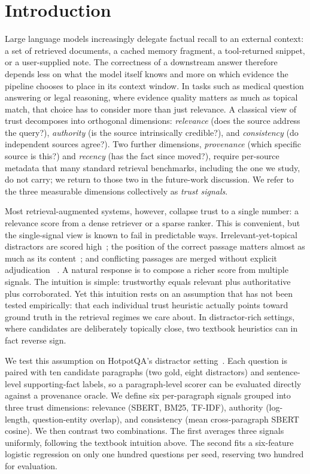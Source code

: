 \section{Introduction}
\label{sec:introduction}

Large language models increasingly delegate factual recall to an
external context: a set of retrieved documents, a cached memory
fragment, a tool-returned snippet, or a user-supplied note. The
correctness of a downstream answer therefore depends less on what the
model itself knows and more on which evidence the pipeline chooses to
place in its context window. In tasks such as medical question answering or legal reasoning, where
evidence quality matters as much as topical match, that choice has to
consider more than just relevance. A classical view of trust decomposes
into orthogonal dimensions: \emph{relevance} (does the source address
the query?), \emph{authority} (is the source intrinsically credible?),
and \emph{consistency} (do independent sources agree?). Two further
dimensions, \emph{provenance} (which specific source is this?) and
\emph{recency} (has the fact since moved?), require per-source metadata
that many standard retrieval benchmarks, including the one we study,
do not carry; we return to those two in the future-work discussion. We
refer to the three measurable dimensions collectively as \emph{trust
signals}.

Most retrieval-augmented systems, however, collapse trust to a single
number: a relevance score from a dense retriever or a sparse ranker.
This is convenient, but the single-signal view is known to fail in
predictable ways. Irrelevant-yet-topical distractors are scored
high~\cite{yoran2024makingrag}; the position of the correct passage
matters almost as much as its content~\cite{liu2024lostinthemiddle};
and conflicting passages are merged without explicit adjudication
~\cite{xie2024adaptive}. A natural response is to compose a richer
score from multiple signals. The intuition is simple: trustworthy
equals relevant plus authoritative plus corroborated. Yet this
intuition rests on an assumption that has not been tested empirically:
that each individual trust heuristic actually points toward ground
truth in the retrieval regimes we care about. In distractor-rich
settings, where candidates are deliberately topically close, two
textbook heuristics can in fact reverse sign.

We test this assumption on HotpotQA's distractor
setting~\cite{yang2018hotpotqa}. Each question is paired with ten
candidate paragraphs (two gold, eight distractors) and sentence-level
supporting-fact labels, so a paragraph-level scorer can be evaluated
directly against a provenance oracle. We define six per-paragraph
signals grouped into three trust dimensions: relevance (SBERT, BM25,
TF-IDF), authority (log-length, question-entity overlap), and
consistency (mean cross-paragraph SBERT cosine). We then contrast two
combinations. The first averages three signals uniformly, following
the textbook intuition above. The second fits a six-feature logistic
regression on only one hundred questions per seed, reserving two
hundred for evaluation.

